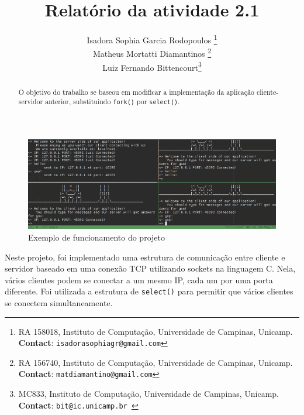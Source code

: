 \documentclass[10pt,twocolumn,letterpaper]{article}
\begin{document}
\title{Relatório da atividade 2.1}
\author{Isadora Sophia Garcia Rodopoulos \thanks{RA 158018, Instituto de Computação, Universidade de Campinas, Unicamp. \textbf{Contact}: \tt\small{isadorasophiagr@gmail.com}} \\
Matheus Mortatti Diamantinos \thanks{RA 156740, Instituto de Computação, Universidade de Campinas, Unicamp. \textbf{Contact}: \tt\small{matdiamantino@gmail.com}}\\
Luiz Fernando Bittencourt\thanks{MC833, Instituto de Computação, Universidade de Campinas, Unicamp. \textbf{Contact}: \tt\small{bit@ic.unicamp.br }}\\
}

\maketitle
\begin{abstract}
O objetivo do trabalho se baseou em modificar a implementação da aplicação cliente-servidor
anterior, substituindo \texttt{fork()} por \texttt{select()}.
\end{abstract}

\begin{figure}
\begin{center}
    \includegraphics[width=1\textwidth]{img/sample.png}
    \caption{Exemplo de funcionamento do projeto}   
\end{center} 
\end{figure}

Neste projeto, foi implementado uma estrutura de comunicação entre cliente e servidor baseado em uma conexão TCP utilizando sockets na linguagem C. Nela, vários clientes podem se conectar a um mesmo IP, cada um por uma porta diferente. Foi utilizada a estrutura de \texttt{select()} para permitir que vários clientes se conectem simultaneamente.
\end{document}
